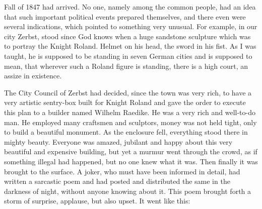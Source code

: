 Fall of 1847 had arrived. No one, namely among the common people, had an idea that such important political events prepared themselves, and there even were several indications, which pointed to something very unusual. For example, in our city Zerbst, stood since God knows when a huge sandstone sculpture which was to portray the Knight Roland. Helmet on his head, the sword in his fist. As I was taught, he is supposed to be standing in seven German cities and is supposed to mean, that wherever such a Roland figure is standing, there is a high court, an assize in existence.

The City Council of Zerbst had decided, since the town was very rich, to have a very artistic sentry-box built for Knight Roland and gave the order to execute this plan to a builder named Wilhelm Raedike. He was a very rich and well-to-do man. He employed many craftsmen and sculptors, money was not held tight, only to build a beautiful monument. As the enclosure fell, everything stood there in mighty beauty. Everyone was amazed, jubilant and happy about this very beautiful and expensive building, but yet a murmur went through the crowd, as if something illegal had happened, but no one knew what it was. Then finally it was brought to the surface. A joker, who must have been informed in detail, had written a sarcastic poem and had posted and distributed the same in the darkness of night, without anyone knowing about it. This poem brought forth a storm of surprise, applause, but also upset. It went like this:

